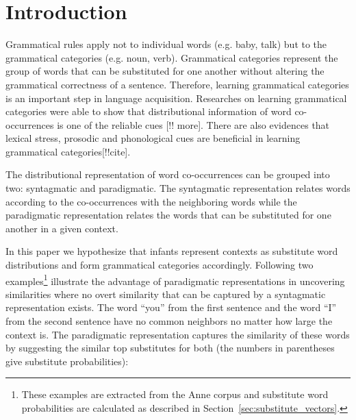 \section{Introduction}
\label{sec:introduction}
Grammatical rules apply not to individual words (e.g. baby, talk) but to the
grammatical categories (e.g. noun, verb).  Grammatical categories represent the
group of words that can be substituted for one another without altering the
grammatical correctness of a sentence.  Therefore, learning grammatical
categories is an important step in language acquisition.  Researches on
learning grammatical categories were able to show that distributional
information of word co-occurrences is one of the reliable cues
\citep*{Mintz200391,clair2010}[!!  more].  There are also evidences that
lexical stress, prosodic and phonological cues are beneficial in learning
grammatical categories[!!cite]. 

The distributional representation of word co-occurrences can be grouped into
two: syntagmatic and paradigmatic.  The syntagmatic representation relates
words according to the co-occurrences with the neighboring words while the
paradigmatic representation relates the words that can be substituted for one
another in a given context.

In this paper we hypothesize that infants represent contexts as substitute word
distributions and form grammatical categories accordingly.
Following two examples\footnote{These examples are extracted from the Anne
corpus and substitute word probabilities are calculated as described in
Section~\ref{sec:substitute_vectors}.} illustrate the advantage of paradigmatic
representations in uncovering similarities where no overt similarity that can
be captured by a syntagmatic representation exists. The word ``you'' from the
first sentence and the word ``I'' from the second sentence have no common
neighbors no matter how large the context is.  The paradigmatic representation
captures the similarity of these words by suggesting the similar top
substitutes for both (the numbers in parentheses give substitute
probabilities): 

